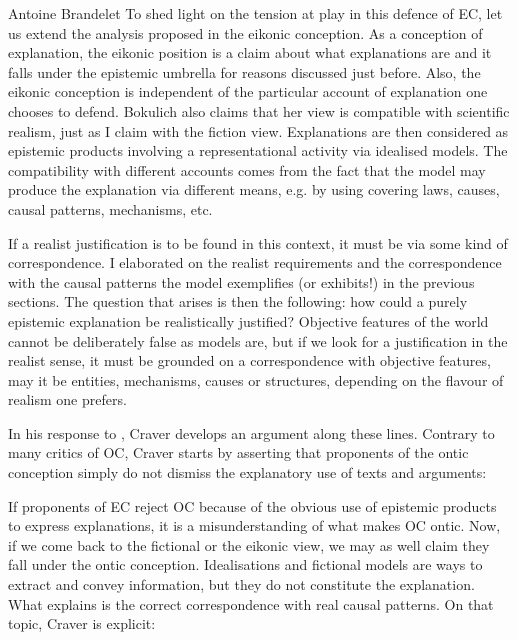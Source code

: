 \begin{artengenv}{Antoine Brandelet}
To shed light on the tension at play in this defence of EC, let us extend the analysis proposed in the eikonic conception. As a conception of explanation, the eikonic position is a claim about what explanations are and it falls under the epistemic umbrella for reasons discussed just before. Also, the eikonic conception is independent of the particular account of explanation one chooses to defend. Bokulich also claims that her view is compatible with scientific realism, just as I claim with the fiction view. Explanations are then considered as epistemic products involving a representational activity via idealised models. The compatibility with different accounts comes from the fact that the model may produce the explanation via different means, e.g. by using covering laws, causes, causal patterns, mechanisms, etc.

If a realist justification is to be found in this context, it must be via some kind of correspondence. I elaborated on the realist requirements and the correspondence with the causal patterns the model exemplifies (or exhibits!) in the previous sections. The question that arises is then the following: how could a purely epistemic explanation be realistically justified? Objective features of the world cannot be deliberately false as models are, but if we look for a justification in the realist sense, it must be grounded on a correspondence with objective features, may it be entities, mechanisms, causes or structures, depending on the flavour of realism one prefers.

In his response to \parencite{Bokulich2016}, Craver develops an argument along these lines. Contrary to many critics of OC, Craver starts by asserting that proponents of the ontic conception simply do not dismiss the explanatory use of texts and arguments:


If proponents of EC reject OC because of the obvious use of epistemic products to express explanations, it is a misunderstanding of what makes OC ontic. Now, if we come back to the fictional or the eikonic view, we may as well claim they fall under the ontic conception. Idealisations and fictional models are ways to extract and convey information, but they do not constitute the explanation. What explains is the correct correspondence with real causal patterns. On that topic, Craver is explicit:


\end{artengenv}
